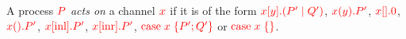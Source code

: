 \begin{definition}[Action]\label{def:cp-action}
  A process $\textcolor{red}{P}$ \emph{acts on} a channel $\textcolor{red}{x}$ if it is of the form
  $\textcolor{red}{x[y].(P' \mid Q')}$, $\textcolor{red}{x(y).P'}$, $\textcolor{red}{x[].0}$,
  $\textcolor{red}{x().P'}$, $\textcolor{red}{x[\text{inl}].P'}$, $\textcolor{red}{x[\text{inr}].P'}$,
  $\textcolor{red}{\text{case}\;x\;\{P';Q'\}}$ or $\textcolor{red}{\text{case}\;x\;\{\}}$. 
\end{definition}
